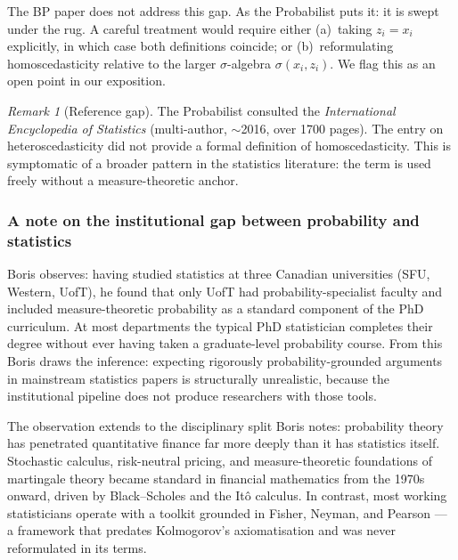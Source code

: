 \documentclass[a4paper,oneside,12pt]{extarticle}
\theoremstyle{plain}
\theoremstyle{definition}
\theoremstyle{remark}
\newtheorem{remark}[proposition]{Remark}
\begin{document}
The BP paper does not address this gap.  As the Probabilist puts it: it is
swept under the rug.  A careful treatment would require either
(a)~taking $z_i = x_i$ explicitly, in which case both definitions
coincide; or (b)~reformulating homoscedasticity relative to the
larger $\sigma$-algebra $\sigma(x_i, z_i)$.  We flag this as an
open point in our exposition.

\begin{remark}[Reference gap]
The Probabilist consulted the \emph{International Encyclopedia of
Statistics} (multi-author, $\sim$2016, over 1700 pages).  The
entry on heteroscedasticity did not provide a formal definition of
homoscedasticity.  This is symptomatic of a broader pattern in the
statistics literature: the term is used freely without a
measure-theoretic anchor.
\end{remark}

\subsubsection*{A note on the institutional gap between probability and statistics}

Boris observes: having studied statistics at three Canadian
universities (SFU, Western, UofT), he found that only UofT had
probability-specialist faculty and included measure-theoretic
probability as a standard component of the PhD curriculum.  At most
departments the typical PhD statistician completes their degree
without ever having taken a graduate-level probability course.
From this Boris draws the inference: expecting rigorously
probability-grounded arguments in mainstream statistics papers is
structurally unrealistic, because the institutional pipeline does
not produce researchers with those tools.

The observation extends to the disciplinary split Boris notes:
probability theory has penetrated quantitative finance far more
deeply than it has statistics itself.  Stochastic calculus, risk-neutral
pricing, and measure-theoretic foundations of martingale theory became
standard in financial mathematics from the 1970s onward, driven by
Black--Scholes and the Itô calculus.  In contrast, most working
statisticians operate with a toolkit grounded in Fisher, Neyman, and
Pearson — a framework that predates Kolmogorov's axiomatisation and
was never reformulated in its terms.
\end{document}
